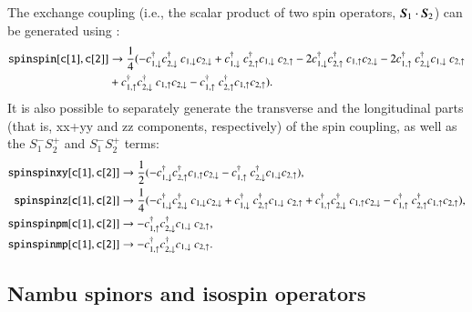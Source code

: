 \documentclass[3p,number,preprint]{elsarticle}
\begin{document}
The exchange coupling (i.e., the scalar product of two spin operators,
$\boldsymbol{S}_1 \cdot \boldsymbol{S}_2$) can be generated using
:
%
\begin{equation}
\begin{split}
{\tt spinspin[c[1],c[2]]} &\to \frac{1}{4} (-c^\dag_{1,\downarrow}
c^\dag_{2,\downarrow} \
c_{1,\downarrow} c_{2,\downarrow}+c^\dag_{1,\downarrow} \
c^\dag_{2,\uparrow} c_{1,\downarrow} \
c_{2,\uparrow}-2c^\dag_{1,\downarrow} c^\dag_{2,\uparrow} \
c_{1,\uparrow} c_{2,\downarrow}-2c^\dag_{1,\uparrow} \
c^\dag_{2,\downarrow} c_{1,\downarrow} \
c_{2,\uparrow} \\
&+c^\dag_{1,\uparrow} c^\dag_{2,\downarrow} \
c_{1,\uparrow} c_{2,\downarrow}-c^\dag_{1,\uparrow} \
c^\dag_{2,\uparrow} c_{1,\uparrow} c_{2,\uparrow}).
\end{split}
\end{equation}
%
It is also possible to separately generate the transverse and the
longitudinal parts (that is, xx+yy and zz components, respectively) of
the spin coupling, as well as the $S_1^- S_2^+$ and $S_1^- S_2^+$
terms:
%
\begin{equation}
\begin{split}
\mma{spinspinxy[c[1],c[2]]} &\to \frac{1}{2} (-c^\dag_{1,\downarrow}
c^\dag_{2,\uparrow} c_{1,\uparrow}
c_{2,\downarrow}-c^\dag_{1,\uparrow} \
c^\dag_{2,\downarrow} c_ {1,\downarrow} c_ {2,\uparrow}), \\
%
\mma{spinspinz[c[1],c[2]]} &\to
\frac{1}{4} (-c^\dag_{1,\downarrow} c^\dag_{2,\downarrow} \
c_{1,\downarrow} c_{2,\downarrow}+c^\dag_{1,\downarrow} \
c^\dag_{2,\uparrow} c_{1,\downarrow} \
c_{2,\uparrow}+c^\dag_{1,\uparrow} c^\dag_{2,\downarrow} \
c_{1,\uparrow} c_{2,\downarrow}-c^\dag_{1,\uparrow} \
c^\dag_{2,\uparrow} c_{1,\uparrow} c_{2,\uparrow}), \\
%
\mma{spinspinpm[c[1],c[2]]} &\to
-c^\dag_{1,\uparrow} c^\dag_{2,\downarrow} c_{1,\downarrow} \
c_{2,\uparrow}, \\
%
\mma{spinspinmp[c[1],c[2]]} &\to
-c^\dag_{1,\uparrow} c^\dag_{2,\downarrow} c_{1,\downarrow} \
c_{2,\uparrow}.
%
\end{split}
\end{equation}


\subsection{Nambu spinors and isospin operators}
\end{document}
